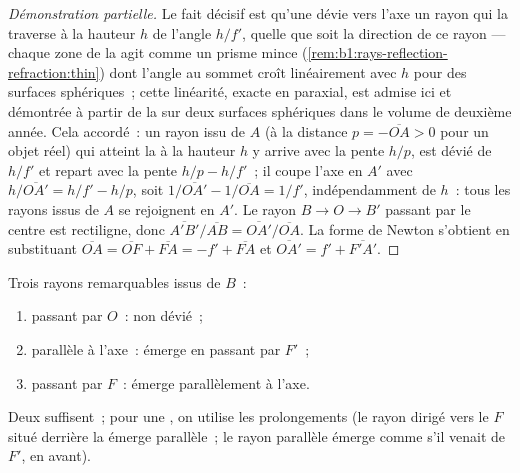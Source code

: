 \begin{proof}[Démonstration partielle]
Le fait décisif est qu'une  dévie vers l'axe un rayon qui
la traverse à la hauteur $h$ de l'angle $h/f'$, quelle que soit la
direction de ce rayon --- chaque zone de la  agit comme un
prisme mince (\cref{rem:b1:rays-reflection-refraction:thin}) dont
l'angle au sommet croît linéairement avec $h$ pour des surfaces
sphériques~; cette linéarité, exacte en paraxial, est admise ici et
démontrée à partir de la  sur deux surfaces
sphériques dans le volume de deuxième année. Cela accordé~: un rayon
issu de $A$ (à la distance $p = -\overline{OA} > 0$ pour un objet réel)
qui atteint la  à la hauteur $h$ y arrive avec la pente $h/p$,
est dévié de $h/f'$ et repart avec la pente $h/p - h/f'$~; il coupe
l'axe en $A'$ avec $h/\overline{OA'} = h/f' - h/p$, soit $1/\overline{OA'}
- 1/\overline{OA} = 1/f'$, indépendamment de $h$~: tous les rayons issus
de $A$ se rejoignent en $A'$. Le rayon $B \to O \to B'$ passant par le
centre est rectiligne, donc
$\overline{A'B'}/\overline{AB} = \overline{OA'}/\overline{OA}$. La forme
de Newton s'obtient en substituant $\overline{OA} = \overline{OF} + \overline{FA}
= -f' + \overline{FA}$ et $\overline{OA'} = f' + \overline{F'A'}$.
\end{proof}

\begin{method}\label{met:b1:mirrors-thin-lenses:lensrays}
Trois rayons remarquables issus de $B$~:
\begin{enumerate}
  \item passant par $O$~: non dévié~;
  \item parallèle à l'axe~: émerge en passant par $F'$~;
  \item passant par $F$~: émerge parallèlement à l'axe.
\end{enumerate}
Deux suffisent~; pour une , on utilise les
prolongements (le rayon dirigé vers le $F$ situé derrière la 
émerge parallèle~; le rayon parallèle émerge comme s'il venait de $F'$,
en avant).
\end{method}

